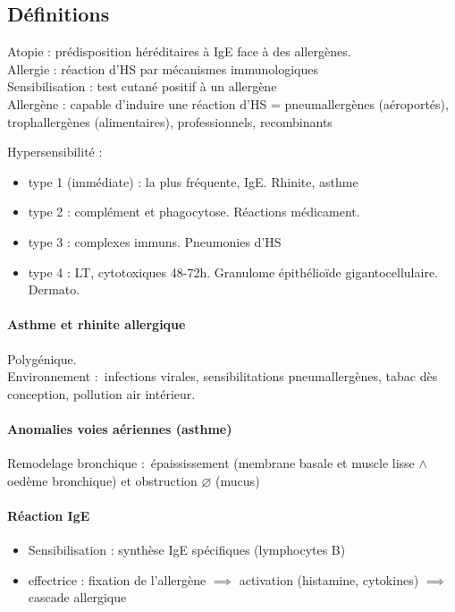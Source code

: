 \documentclass{article}
\begin{document}
\subsection{Définitions}%
Atopie : prédisposition héréditaires à IgE face à des allergènes.\\
Allergie : réaction d'HS par mécanismes immunologiques\\
Sensibilisation : test cutané positif à un allergène\\
Allergène : capable d'induire une réaction d'HS = pneumallergènes (aéroportés),
trophallergènes (alimentaires), professionnels, recombinants

Hypersensibilité :
\begin{itemize}
\item type 1 (immédiate) : la plus fréquente, IgE. Rhinite, asthme
\item type 2 : complément et phagocytose. Réactions médicament.
\item type 3 : complexes immuns. Pneumonies d'HS
\item type 4 : LT, cytotoxiques 48-72h. Granulome épithélioïde gigantocellulaire.
  Dermato.
\end{itemize}

\paragraph{Asthme et rhinite allergique}
Polygénique.\\
Environnement : infections virales, sensibilitations pneumallergènes, tabac dès
conception, pollution air intérieur. 

\paragraph{Anomalies voies aériennes (asthme)}
Remodelage bronchique : épaississement (membrane basale et muscle lisse $\wedge$ oedème
bronchique) et obstruction $\diameter$ (mucus)

\paragraph{Réaction IgE}
\begin{itemize}
\item Sensibilisation : synthèse IgE spécifiques (lymphocytes B)
\item effectrice : fixation de l'allergène $\implies$ activation (histamine,
  cytokines) $\implies$ cascade allergique
\end{itemize}
\end{document}
